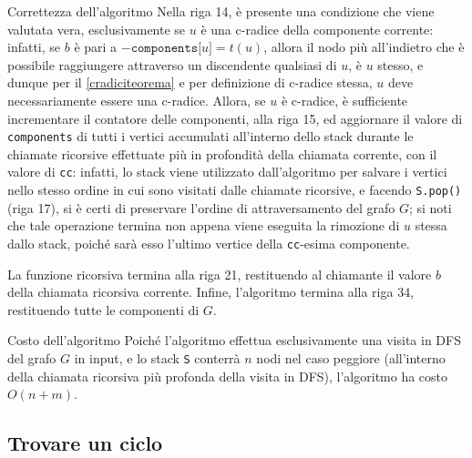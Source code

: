 \documentclass[a4paper, 12pt]{report}
\begin{document}
\begin{framedobs}{Correttezza dell'algoritmo}
        Nella riga 14, è presente una condizione che viene valutata vera, esclusivamente se $u$ è una c-radice della componente corrente: infatti, se $b$ è pari a $-\texttt{components[}u\texttt{]} = t(u)$, allora il nodo più all'indietro che è possibile raggiungere attraverso un discendente qualsiasi di $u$, è $u$ stesso, e dunque per il \cref{cradiciteorema} e per definizione di c-radice stessa, $u$ deve necessariamente essere una c-radice. Allora, se $u$ è c-radice, è sufficiente incrementare il contatore delle componenti, alla riga 15, ed aggiornare il valore di \texttt{components} di tutti i vertici accumulati all'interno dello stack durante le chiamate ricorsive effettuate più in profondità della chiamata corrente, con il valore di \texttt{cc}: infatti, lo stack viene utilizzato dall'algoritmo per salvare i vertici nello stesso ordine in cui sono visitati dalle chiamate ricorsive, e facendo \texttt{S.pop()} (riga 17), si è certi di preservare l'ordine di attraversamento del grafo $G$; si noti che tale operazione termina non appena viene eseguita la rimozione di $u$ stessa dallo stack, poiché sarà esso l'ultimo vertice della \texttt{cc}-esima componente.

        La funzione ricorsiva termina alla riga 21, restituendo al chiamante il valore $b$ della chiamata ricorsiva corrente. Infine, l'algoritmo termina alla riga 34, restituendo tutte le componenti di $G$.
    \end{framedobs}

    \begin{framedobs}{Costo dell'algoritmo}
        Poiché l'algoritmo effettua esclusivamente una visita in DFS del grafo $G$ in input, e lo stack \texttt{S} conterrà $n$ nodi nel caso peggiore (all'interno della chiamata ricorsiva più profonda della visita in DFS), l'algoritmo ha costo $O(n + m)$.
    \end{framedobs}

    \subsection{Trovare un ciclo}
\end{document}
